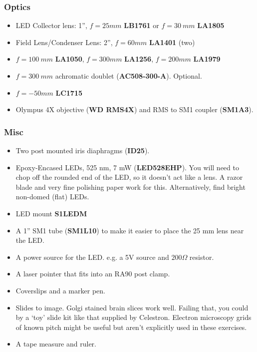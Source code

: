 \documentclass[a4paper]{report}
\begin{document}
\subsubsection{Optics}
\begin{itemize}
\setlength\itemsep{0.15em}
\item LED Collector lens: 1'', $f=25 mm$ \textbf{LB1761} or $f=30~mm$ \textbf{LA1805}
\item Field Lens/Condenser Lens: 2'', $f=60 mm$ \textbf{LA1401} (two)
\item $f=100~mm$ \textbf{LA1050}, $f=300 mm$ \textbf{LA1256}, $f=200 mm$ \textbf{LA1979}
\item $f=300~mm$ achromatic doublet (\textbf{AC508-300-A}). Optional.
\item $f=-50 mm$ \textbf{LC1715}
\item Olympus 4X objective (\textbf{WD RMS4X}) and RMS to SM1 coupler (\textbf{SM1A3}).
\end{itemize}

\subsubsection{Misc}
\begin{itemize}
\setlength\itemsep{0.15em}
\item Two post mounted iris diaphragms (\textbf{ID25}). 
\item Epoxy-Encased LEDs, 525 nm, 7 mW (\textbf{LED528EHP}).
You will need to chop off the rounded end of the LED, so it doesn't act like a lens.  
A razor blade and very fine polishing paper work for this. Alternatively, find bright non-domed (flat) LEDs.
\item LED mount \textbf{S1LEDM}
\item A 1'' SM1 tube (\textbf{SM1L10}) to make it easier to place the 25 mm lens near the LED.
\item A power source for the LED. e.g. a 5V source and $200\Omega$ resistor. 
\item A laser pointer that fits into an RA90 post clamp. 
\item Coverslips and a marker pen.
\item Slides to image. Golgi stained brain slices work well. 
Failing that, you could by a `toy' slide kit like that supplied by Celestron. 
Electron microscopy grids of known pitch might be useful but aren't explicitly used in these exercises.
\item A tape measure and ruler. 
\end{itemize}
\end{document}
